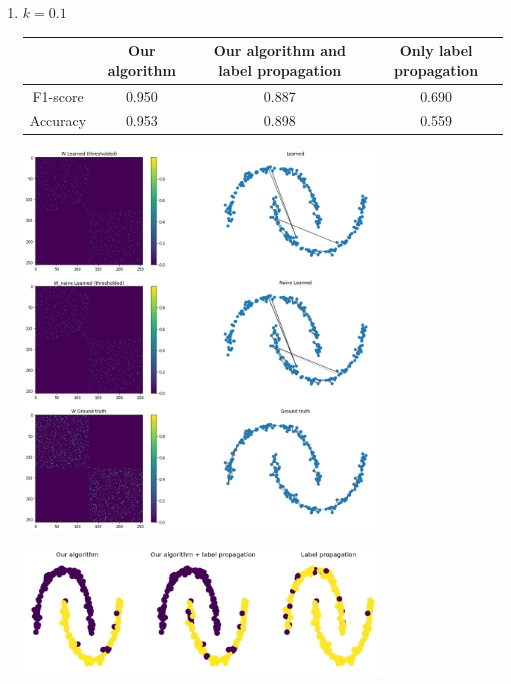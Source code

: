 \documentclass[a4paper]{article}
\begin{document}
\begin{enumerate}
\begin{center}
        \end{center}
        \newpage
    \item $k = 0.1$
        \begin{center}
            \begin{tabular}{|c|c|c|c|}
                \hline
                    & Our algorithm & Our algorithm and label propagation & Only label propagation\\
                \hline
                F1-score & 0.950 & 0.887 & 0.690 \\
                \hline
                Accuracy & 0.953 & 0.898 & 0.559 \\
                \hline
            \end{tabular}
        \end{center}
        \begin{center}
            \includegraphics[width=0.75\textwidth]{images/p4/10_percent_learned_graphs.png}
        \end{center}
        \begin{center}
            \includegraphics[width=0.75\textwidth]{images/p4/10_percent_predicted_labels.png}
        \end{center}
    \newpage


\end{enumerate}
\end{document}
